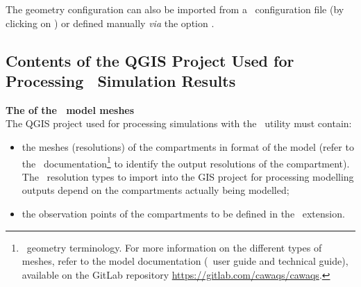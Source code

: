 The geometry configuration can also be imported from a \json~configuration file (by clicking on )
or defined manually \textit{via} the option .


\subsection{Contents of the QGIS Project Used for Processing \cawaqs~Simulation Results}
\label{sec-res-cawaqs}

\textbf{{The  of the \cawaqs~model meshes}}\\
The QGIS project used for processing simulations with the \cwv~utility
must contain:
\begin{itemize}
    \item the meshes (resolutions) of the compartments in 
        format of the model (refer to the \cawaqs~documentation\footnote{\cawaqs~geometry terminology. For more information on the different types of meshes,
        refer to the model documentation (\ie~user guide and technical guide),
        available on the GitLab repository \href{https://gitlab.com/cawaqs/cawaqs}{https://gitlab.com/cawaqs/cawaqs}.}
        to identify the output resolutions of the  compartment).
        The \cawaqs~resolution types to import into the GIS project for
        processing modelling outputs depend on the compartments
        actually being modelled;

    \item the observation points of the compartments to be defined in the \cwv~extension.
\end{itemize}

